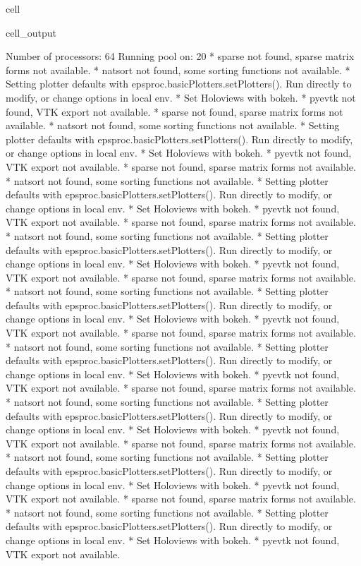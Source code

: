 \documentclass[letterpaper,table,10pt,english]{jupyterBook}
\begin{document}
\begin{sphinxuseclass}{cell}
\begin{sphinxVerbatimOutput}
\begin{sphinxuseclass}{cell_output}
\begin{sphinxVerbatim}[commandchars=\\\{\}]
Number of processors:  64 
Running pool on:  20
* sparse not found, sparse matrix forms not available. 
* natsort not found, some sorting functions not available. 
* Setting plotter defaults with epsproc.basicPlotters.setPlotters(). Run directly to modify, or change options in local env.
* Set Holoviews with bokeh.
* pyevtk not found, VTK export not available. 
* sparse not found, sparse matrix forms not available. 
* natsort not found, some sorting functions not available. 
* Setting plotter defaults with epsproc.basicPlotters.setPlotters(). Run directly to modify, or change options in local env.
* Set Holoviews with bokeh.
* pyevtk not found, VTK export not available. 
* sparse not found, sparse matrix forms not available. 
* natsort not found, some sorting functions not available. 
* Setting plotter defaults with epsproc.basicPlotters.setPlotters(). Run directly to modify, or change options in local env.
* Set Holoviews with bokeh.
* pyevtk not found, VTK export not available. 
* sparse not found, sparse matrix forms not available. 
* natsort not found, some sorting functions not available. 
* Setting plotter defaults with epsproc.basicPlotters.setPlotters(). Run directly to modify, or change options in local env.
* Set Holoviews with bokeh.
* pyevtk not found, VTK export not available. 
* sparse not found, sparse matrix forms not available. 
* natsort not found, some sorting functions not available. 
* Setting plotter defaults with epsproc.basicPlotters.setPlotters(). Run directly to modify, or change options in local env.
* Set Holoviews with bokeh.
* pyevtk not found, VTK export not available. 
* sparse not found, sparse matrix forms not available. 
* natsort not found, some sorting functions not available. 
* Setting plotter defaults with epsproc.basicPlotters.setPlotters(). Run directly to modify, or change options in local env.
* Set Holoviews with bokeh.
* pyevtk not found, VTK export not available. 
* sparse not found, sparse matrix forms not available. 
* natsort not found, some sorting functions not available. 
* Setting plotter defaults with epsproc.basicPlotters.setPlotters(). Run directly to modify, or change options in local env.
* Set Holoviews with bokeh.
* pyevtk not found, VTK export not available. 
* sparse not found, sparse matrix forms not available. 
* natsort not found, some sorting functions not available. 
* Setting plotter defaults with epsproc.basicPlotters.setPlotters(). Run directly to modify, or change options in local env.
* Set Holoviews with bokeh.
* pyevtk not found, VTK export not available. 
* sparse not found, sparse matrix forms not available. 
* natsort not found, some sorting functions not available. 
* Setting plotter defaults with epsproc.basicPlotters.setPlotters(). Run directly to modify, or change options in local env.
* Set Holoviews with bokeh.
* pyevtk not found, VTK export not available. 
\end{sphinxVerbatim}


\end{sphinxuseclass}
\end{sphinxVerbatimOutput}
\end{sphinxuseclass}
\end{document}
